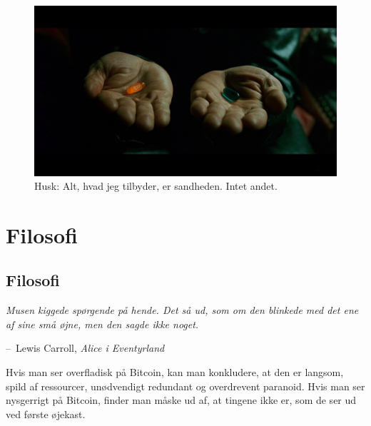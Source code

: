 \documentclass[paper=6in:9in,pagesize=pdftex,
               headinclude=on,footinclude=on,12pt]{scrbook}
\makeatletter
\newenvironment{chapquote}[2][4em]{\setlength{\@tempdima}{#1}%
   \def\chapquote@author{#2}%
   \parshape 1 \@tempdima \dimexpr\textwidth-2\@tempdima\relax%
   \itshape}{\par\normalfont\hfill--\ \chapquote@author\hspace*{\@tempdima}\par\bigskip}
\makeatother
\begin{document}
\begin{figure}
  \includegraphics{assets/images/bitcoin-orange-pill.jpg}
  \caption*{Husk: Alt, hvad jeg tilbyder, er sandheden. Intet andet.}
  \label{fig:bitcoin-orange-pill}
\end{figure}%
%
%

\part{Filosofi}
\label{ch:philosophy}
\chapter*{Filosofi}

\begin{chapquote}{Lewis Carroll, \textit{Alice i Eventyrland}} Musen kiggede spørgende på hende. Det så ud, som om den blinkede med det ene af sine små øjne, men den sagde ikke noget. \end{chapquote}

Hvis man ser overfladisk på Bitcoin, kan man konkludere, at den er langsom, spild af ressourcer, unødvendigt redundant og overdrevent paranoid. Hvis man ser nysgerrigt på Bitcoin, finder man måske ud af, at tingene ikke er, som de ser ud ved første øjekast.
\end{document}
